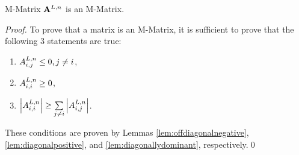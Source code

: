 \begin{lemma}{M-Matrix}
  $\loworderssmatrix[\timeindex]$ is an M-Matrix.
\end{lemma}
\begin{proof}
To prove that a matrix is an M-Matrix, it is sufficient to prove that
the following 3 statements are true:
\begin{enumerate}
\item $A^{L,n}_{i,j}\le 0, j\ne i$,
\item $A^{L,n}_{i,i}\ge 0$,
\item $\left|A^{L,n}_{i,i}\right|
      \ge \sum\limits_{j\ne i} \left|A^{L,n}_{i,j}\right|$.
\end{enumerate}
These conditions are proven by Lemmas \ref{lem:offdiagonalnegative},
\ref{lem:diagonalpositive}, and \ref{lem:diagonallydominant}, respectively.\qed
\end{proof}
